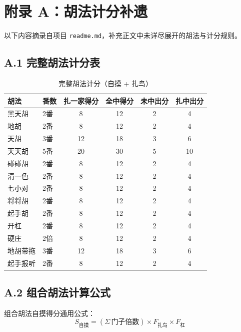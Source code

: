 \documentclass[11pt,a4paper]{article}
\begin{document}
\newpage
\section*{附录 A：胡法计分补遗}

以下内容摘录自项目 \texttt{readme.md}，补充正文中未详尽展开的胡法与计分规则。

\subsection*{A.1 完整胡法计分表}

\begin{table}[H]
\centering
\caption{完整胡法计分（自摸 + 扎鸟）}
\label{tab:score_full}
\footnotesize
\begin{tabular}{@{}llcccc@{}}
\toprule
\textbf{胡法} & \textbf{番数} & \textbf{扎一家得分} & \textbf{全中得分} & \textbf{未中出分} & \textbf{扎中出分} \\
\midrule
黑天胡  & 2番 & 8  & 12 & 2  & 4  \\
地胡    & 2番 & 8  & 12 & 2  & 4  \\
天胡    & 3番 & 12 & 18 & 3  & 6  \\
天天胡  & 5番 & 20 & 30 & 5  & 10 \\
碰碰胡  & 2番 & 8  & 12 & 2  & 4  \\
清一色  & 2番 & 8  & 12 & 2  & 4  \\
七小对  & 2番 & 8  & 12 & 2  & 4  \\
将将胡  & 2番 & 8  & 12 & 2  & 4  \\
起手胡  & 2番 & 8  & 12 & 2  & 4  \\
开杠    & 2番 & 8  & 12 & 2  & 4  \\
硬庄    & 2倍 & 8  & 12 & 2  & 4  \\
地胡带拖& 3番 & 12 & 18 & 3  & 6  \\
起手报听& 2番 & 8  & 12 & 2  & 4  \\
\bottomrule
\end{tabular}
\end{table}

\subsection*{A.2 组合胡法计算公式}

组合胡法自摸得分通用公式：
\begin{equation}
S_{\text{自摸}} = (\Sigma\,\text{门子倍数}) \times F_{\text{扎鸟}} \times F_{\text{杠}}
\end{equation}
\end{document}
